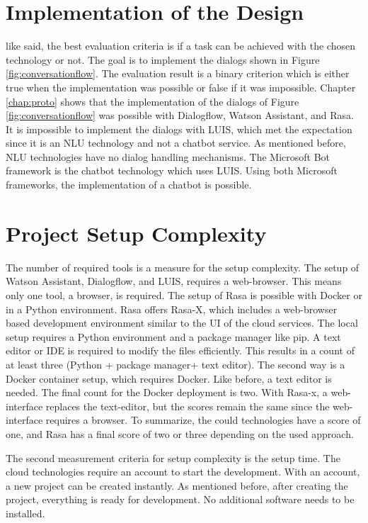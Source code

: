 \section*{Implementation of the Design}
like \citet{singhbuilding} said, the best evaluation criteria is if a task can be achieved with the chosen technology or not.
The goal is to implement the dialogs shown in Figure \ref{fig:conversationflow}.
The evaluation result is a binary criterion which is either true when the implementation was possible or false if it was impossible.
Chapter \ref{chap:proto} shows that the implementation of the dialogs of Figure \ref{fig:conversationflow}  was possible with Dialogflow, Watson Assistant, and Rasa.
It is impossible to implement the dialogs with LUIS, which met the expectation since it is an NLU technology and not a chatbot service. 
As mentioned before, NLU technologies have no dialog handling mechanisms.
The Microsoft Bot framework is the chatbot technology which uses LUIS.
Using both Microsoft frameworks, the implementation of a chatbot is possible.

\section*{Project Setup Complexity} \label{sec:setup_complex}
The number of required tools is a measure for the setup complexity.
The setup of Watson Assistant, Dialogflow, and LUIS, requires a web-browser.
This means only one tool, a browser, is required.
The setup of Rasa is possible with Docker or in a Python environment.
Rasa offers Rasa-X, which includes a web-browser based development environment similar to the UI of the cloud services.
The local setup requires a Python environment and a package manager like pip.
A text editor or IDE is required to modify the files efficiently.
This results in a count of at least three (Python + package manager+ text editor).
The second way is a Docker container setup, which requires Docker.
Like before, a text editor is needed.
The final count for the Docker deployment is two.
With Rasa-x, a web-interface replaces the text-editor, but the scores remain the same since the web-interface requires a browser.
To summarize, the could technologies have a score of one, and Rasa has a final score of two or three depending on the used approach.

The second measurement criteria for setup complexity is the setup time.
The cloud technologies require an account to start the development.
With an account, a new project can be created instantly.
As mentioned before, after creating the project, everything is ready for development.
No additional software needs to be installed.

